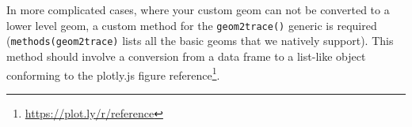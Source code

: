\documentclass[
  12pt,
]{krantz}
\renewcommand{\href}[2]{#2\footnote{\url{#1}}}
\begin{document}
In more complicated cases, where your custom geom can not be converted to a lower level geom, a custom method for the \texttt{geom2trace()} generic is required (\texttt{methods(geom2trace)} lists all the basic geoms that we natively support). This method should involve a conversion from a data frame to a list-like object conforming to the \href{https://plot.ly/r/reference}{plotly.js figure reference}.
\end{document}

